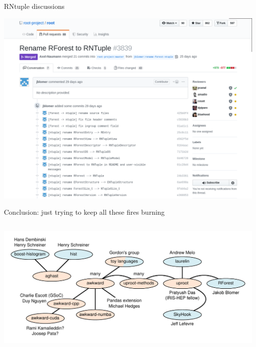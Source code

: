\documentclass[aspectratio=169]{beamer}
\begin{document}
\begin{frame}{ RNtuple discussions}
\vspace{-0.04 cm}

\begin{center}
\includegraphics[width=0.85\linewidth]{rforest-rntuple.png}
\end{center}
\end{frame}

\begin{frame}{Conclusion: just trying to keep all these fires burning}
\vspace{0.5 cm}
\begin{columns}
\includegraphics[width=\linewidth]{projects.pdf}
\end{columns}
\end{frame}
\end{document}
